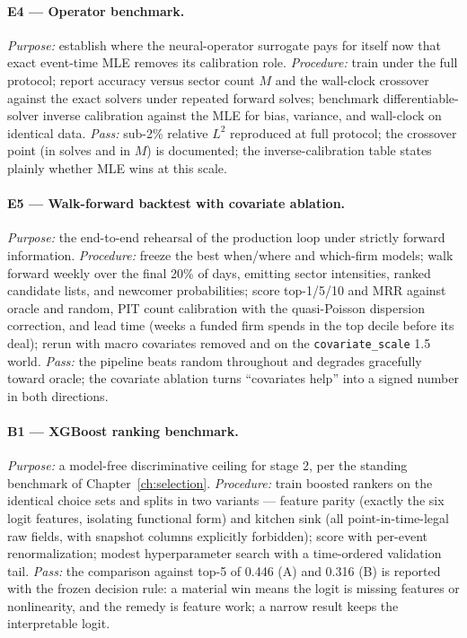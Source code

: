 \paragraph{E4 --- Operator benchmark.}
\emph{Purpose:} establish where the neural-operator surrogate pays for itself now that exact event-time MLE
removes its calibration role. \emph{Procedure:} train under the full protocol; report accuracy versus
sector count $M$ and the wall-clock crossover against the exact solvers under repeated forward solves;
benchmark differentiable-solver inverse calibration against the MLE for bias, variance, and wall-clock on
identical data. \emph{Pass:} sub-2\% relative $L^2$ reproduced at full protocol; the crossover point (in
solves and in $M$) is documented; the inverse-calibration table states plainly whether MLE wins at this
scale.

\paragraph{E5 --- Walk-forward backtest with covariate ablation.}
\emph{Purpose:} the end-to-end rehearsal of the production loop under strictly forward information.
\emph{Procedure:} freeze the best when/where and which-firm models; walk forward weekly over the final 20\%
of days, emitting sector intensities, ranked candidate lists, and newcomer probabilities; score top-1/5/10
and MRR against oracle and random, PIT count calibration with the quasi-Poisson dispersion correction, and
lead time (weeks a funded firm spends in the top decile before its deal); rerun with macro covariates
removed and on the \texttt{covariate\_scale} 1.5 world. \emph{Pass:} the pipeline beats random throughout
and degrades gracefully toward oracle; the covariate ablation turns ``covariates help'' into a signed
number in both directions.

\paragraph{B1 --- XGBoost ranking benchmark.}
\emph{Purpose:} a model-free discriminative ceiling for stage 2, per the standing benchmark of
Chapter~\ref{ch:selection}. \emph{Procedure:} train boosted rankers on the identical choice sets and splits
in two variants --- feature parity (exactly the six logit features, isolating functional form) and kitchen
sink (all point-in-time-legal raw fields, with snapshot columns explicitly forbidden); score with per-event
renormalization; modest hyperparameter search with a time-ordered validation tail. \emph{Pass:} the
comparison against top-5 of 0.446 (A) and 0.316 (B) is reported with the frozen decision rule: a material
win means the logit is missing features or nonlinearity, and the remedy is feature work; a narrow result
keeps the interpretable logit.

